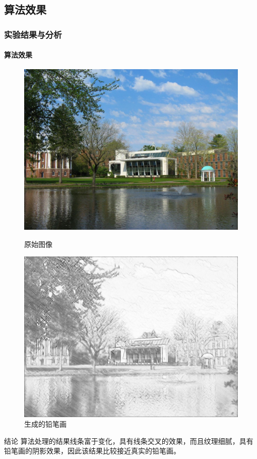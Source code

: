 \documentclass[aspectratio=43, xcolor=svgnames, t, 10pt]{beamer}
\begin{document}
\subsection{算法效果}
\begin{frame}
  \frametitle{实验结果与分析}
  \framesubtitle{算法效果}
  \begin{figure}[!h]
    \centering
    \begin{minipage}[t]{0.45\linewidth}
      \centering
      \includegraphics[width=1\linewidth]{./figure/test-01.jpg}
      \caption{原始图像}
    \end{minipage}
     \hspace{5ex}
    \begin{minipage}[t]{0.45\linewidth}
      \centering
      \includegraphics[width=1\linewidth]{./figure/thesis_rst-01.png}
      \caption{生成的铅笔画}
    \end{minipage}
\end{figure}
  \begin{block}{结论}
    算法处理的结果线条富于变化，具有线条交叉的效果，而且纹理细腻，具有铅笔画的阴影效果，因此该结果比较接近真实的铅笔画。
  \end{block}
\end{frame}
\end{document}
